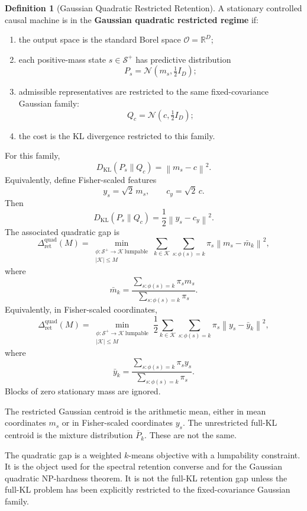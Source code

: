 \documentclass[12pt]{article}
\theoremstyle{definition}
\newtheorem{definition}[theorem]{Definition}
\newcommand{\norm}[1]{\left\lVert#1\right\rVert}
\newcommand{\RetQuad}{\Delta_{\mathrm{ret}}^{\mathrm{quad}}}
\newcommand{\Splus}{\mathcal S^{+}}
\begin{document}
\begin{definition}[Gaussian Quadratic Restricted Retention]
\label{def:gaussian-quadratic}
A stationary controlled causal machine is in the \textbf{Gaussian quadratic
restricted regime} if:
\begin{enumerate}[label=(\arabic*)]
\item the output space is the standard Borel space $\mathcal O=\mathbb R^D$;
\item each positive-mass state $s\in\Splus$ has predictive distribution
\[
P_s=\mathcal N(m_s,\tfrac12 I_D);
\]
\item admissible representatives are restricted to the same fixed-covariance
Gaussian family:
\[
Q_c=\mathcal N(c,\tfrac12 I_D);
\]
\item the cost is the KL divergence restricted to this family.
\end{enumerate}
For this family,
\[
D_{\mathrm{KL}}(P_s\|Q_c)
=
\norm{m_s-c}^2.
\]
Equivalently, define Fisher-scaled features
\[
y_s=\sqrt{2}\,m_s,
\qquad
c_y=\sqrt{2}\,c.
\]
Then
\[
D_{\mathrm{KL}}(P_s\|Q_c)
=
\frac12
\norm{y_s-c_y}^2.
\]
The associated quadratic gap is
\[
\RetQuad(M)
=
\min_{\substack{
\phi:\Splus\to\mathcal K\ \text{lumpable}\\
|\mathcal K|\le M
}}
\sum_{k\in\mathcal K}
\sum_{s:\phi(s)=k}
\pi_s
\norm{m_s-\bar m_k}^2,
\]
where
\[
\bar m_k
=
\frac{
\sum_{s:\phi(s)=k}\pi_s m_s
}{
\sum_{s:\phi(s)=k}\pi_s
}.
\]
Equivalently, in Fisher-scaled coordinates,
\[
\RetQuad(M)
=
\min_{\substack{
\phi:\Splus\to\mathcal K\ \text{lumpable}\\
|\mathcal K|\le M
}}
\frac12
\sum_{k\in\mathcal K}
\sum_{s:\phi(s)=k}
\pi_s
\norm{y_s-\bar y_k}^2,
\]
where
\[
\bar y_k
=
\frac{
\sum_{s:\phi(s)=k}\pi_s y_s
}{
\sum_{s:\phi(s)=k}\pi_s
}.
\]
Blocks of zero stationary mass are ignored.
\end{definition}

The restricted Gaussian centroid is the arithmetic mean, either in mean
coordinates $m_s$ or in Fisher-scaled coordinates $y_s$.  The unrestricted
full-KL centroid is the mixture distribution $\bar P_k$.  These are not the
same.

The quadratic gap is a weighted $k$-means objective with a lumpability
constraint.  It is the object used for the spectral retention converse and for
the Gaussian quadratic NP-hardness theorem.  It is not the full-KL retention
gap unless the full-KL problem has been explicitly restricted to the
fixed-covariance Gaussian family.

\end{document}
